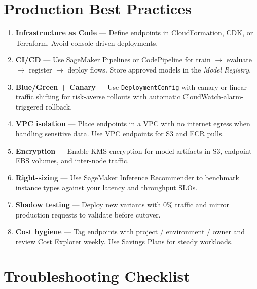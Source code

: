 \documentclass[11pt,a4paper]{article}
\begin{document}
\section{Production Best Practices}

\begin{enumerate}[leftmargin=*]
    \item \textbf{Infrastructure as Code} --- Define endpoints in CloudFormation,
          CDK, or Terraform. Avoid console-driven deployments.
    \item \textbf{CI/CD} --- Use SageMaker Pipelines or CodePipeline for
          train $\rightarrow$ evaluate $\rightarrow$ register $\rightarrow$
          deploy flows. Store approved models in the \emph{Model Registry}.
    \item \textbf{Blue/Green + Canary} --- Use \texttt{DeploymentConfig} with
          canary or linear traffic shifting for risk-averse rollouts with
          automatic CloudWatch-alarm-triggered rollback.
    \item \textbf{VPC isolation} --- Place endpoints in a VPC with no internet
          egress when handling sensitive data. Use VPC endpoints for S3 and ECR
          pulls.
    \item \textbf{Encryption} --- Enable KMS encryption for model artifacts in
          S3, endpoint EBS volumes, and inter-node traffic.
    \item \textbf{Right-sizing} --- Use SageMaker Inference Recommender to
          benchmark instance types against your latency and throughput SLOs.
    \item \textbf{Shadow testing} --- Deploy new variants with 0\% traffic and
          mirror production requests to validate before cutover.
    \item \textbf{Cost hygiene} --- Tag endpoints with project / environment /
          owner and review Cost Explorer weekly. Use Savings Plans for steady
          workloads.
\end{enumerate}

\section{Troubleshooting Checklist}
\end{document}
